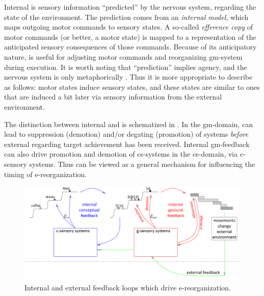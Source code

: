   Internal  is sensory information “predicted” by the nervous system, regarding the state of the environment. The prediction comes from an \textit{internal model}, which maps outgoing motor commands to sensory states. A so-called \textit{efference copy} of motor commands (or better, a motor state) is mapped to a representation of the anticipated sensory consequences of those commands. Because of its anticipatory nature,  is useful for adjusting motor commands and reorganizing gm-system during execution. It is worth noting that “prediction” implies agency, and the nervous system is only metaphorically . Thus it is more appropriate to describe  as follows: motor states induce sensory states, and these states are similar to ones that are induced a bit later via sensory information from the external environment.

The distinction between internal and  is schematized in {}. In the gm-domain,  can lead to suppression (demotion) and/or degating (promotion) of systems \textit{before} external  regarding target achievement has been received. Internal gm-feedback can also drive promotion and demotion of cs-systems in the cs-domain, via c-sensory systems. Thus  can be viewed as a general mechanism for influencing the timing of e-reorganization.

  
\begin{figure}
\includegraphics[width=\textwidth]{figures/Tilsen-img57.png}
\caption{Internal and external feedback loops which drive e-reorganization.}
\label{fig:4:7}
\end{figure}
       

